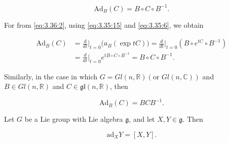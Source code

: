 \begin{equation}
\tag{9}\label{eq:3.46:9}
\mathrm{Ad}_{B}(C)=B\circ C\circ B^{-1}.
\end{equation}

For from \eqref{eq:3.36:2}, using \eqref{eq:3.35:15} and \eqref{eq:3.35:6}, we obtain

\begin{align*}\mathrm{Ad}_{B}(C)&=\frac{d}{dt}\bigg|_{t=0}\big(a_{B}(\exp t C)\big)=\frac{d}{dt}\bigg|_{t=0}(B\circ e^{tC}\circ B^{-1})\\&=\frac{d}{dt}\bigg|_{t=0}e^{t B\circ C\circ B^{-1}}=B\circ C\circ B^{-1}.\end{align*}

Similarly, in the case in which $G = Gl(n, \mathbb{R})(\text{or } Gl(n, \mathbb{C}))$ and $B \in Gl(n, \mathbb{R})$ and $C \in \mathfrak{gl}(n, \mathbb{R})$, then

\begin{equation}
\tag{10}\label{eq:3.46:10}
\mathrm{Ad}_{B}(C)=B C B^{-1}.
\end{equation}

\begin{proposition}\label{thm:3.47}
Let $G$ be a Lie group with Lie algebra $\mathfrak{g}$, and let $X,Y\in\mathfrak{g}$. Then

\begin{equation}
\tag{1}\label{eq:3.47:1}
\mathrm{ad}_{X}Y=[X,Y].
\end{equation}

\end{proposition}

